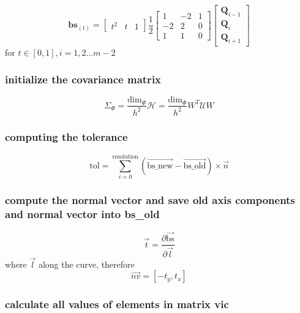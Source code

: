 \documentclass[11pt]{article}
\begin{document}
\begin{displaymath}
\mathbf{bs}_(t) = \begin{bmatrix} t^2 & t & 1 \end{bmatrix} \frac{1}{2} \begin{bmatrix}
1 & -2 & 1 \\
-2 &  2 & 0 \\
1 &  1 & 0 \end{bmatrix}
\begin{bmatrix} \mathbf{Q}_{i-1} \\ \mathbf{Q}_{i} \\ \mathbf{Q}_{i+1} \end{bmatrix}
\end{displaymath}
for $t \in [0,1], i = 1,2 \ldots m-2$
\subsubsection{initialize the covariance matrix}
\label{sec-1_2_4}

\begin{displaymath}
\Sigma_{\Phi} = \frac{\mathrm{dim}_{\Phi}}{h^2} \mathcal{H} =
\frac{\mathrm{dim}_{\Phi}}{h^2} W^T \mathcal{U} W
\end{displaymath}
\subsubsection{computing the tolerance}
\label{sec-1_2_5}

\begin{displaymath}
\mathrm{tol} =  \sum_{i=0}^{\mathrm{resolution}} (\vec{\mathrm{bs\_new}} -\vec{
\mathrm{bs\_old}}) \times \vec{n}
\end{displaymath}
\subsubsection{compute the normal vector and save old axis components and normal vector into bs\_old}
\label{sec-1_2_6}

\begin{displaymath}
\vec{t} = \frac{\partial \mathrm{\vec{bs}}}{\partial \vec{l}}
\end{displaymath}
where $\vec{l}$ along the curve, therefore
\begin{displaymath}
\vec{nv} = [-t_{y}, t_{x}]
\end{displaymath}
\subsubsection{calculate all values of elements in matrix \textbf{vic}}
\label{sec-1_2_7}
\end{document}

